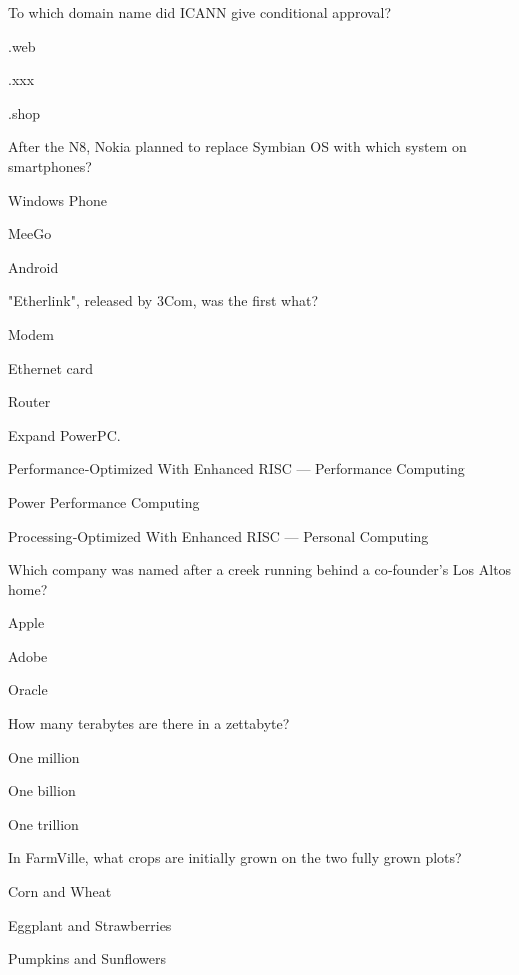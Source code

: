 \begin{enhancedmcq}{To which domain name did ICANN give conditional approval?}
\item .web
\item .xxx
\item .shop

\end{enhancedmcq}
\begin{enhancedmcq}{After the N8, Nokia planned to replace Symbian OS with which system on smartphones?}
\item Windows Phone
\item MeeGo
\item Android

\end{enhancedmcq}
\begin{enhancedmcq}{"Etherlink", released by 3Com, was the first what?}
\item Modem
\item Ethernet card
\item Router

\end{enhancedmcq}
\begin{enhancedmcq}{Expand PowerPC.}
\item Performance‑Optimized With Enhanced RISC — Performance Computing
\item Power Performance Computing
\item Processing‑Optimized With Enhanced RISC — Personal Computing

\end{enhancedmcq}
\begin{enhancedmcq}{Which company was named after a creek running behind a co‑founder's Los Altos home?}
\item Apple
\item Adobe
\item Oracle

\end{enhancedmcq}
\begin{enhancedmcq}{How many terabytes are there in a zettabyte?}
\item One million
\item One billion
\item One trillion

\end{enhancedmcq}
\begin{enhancedmcq}{In FarmVille, what crops are initially grown on the two fully grown plots?}
\item Corn and Wheat
\item Eggplant and Strawberries
\item Pumpkins and Sunflowers

\end{enhancedmcq}

